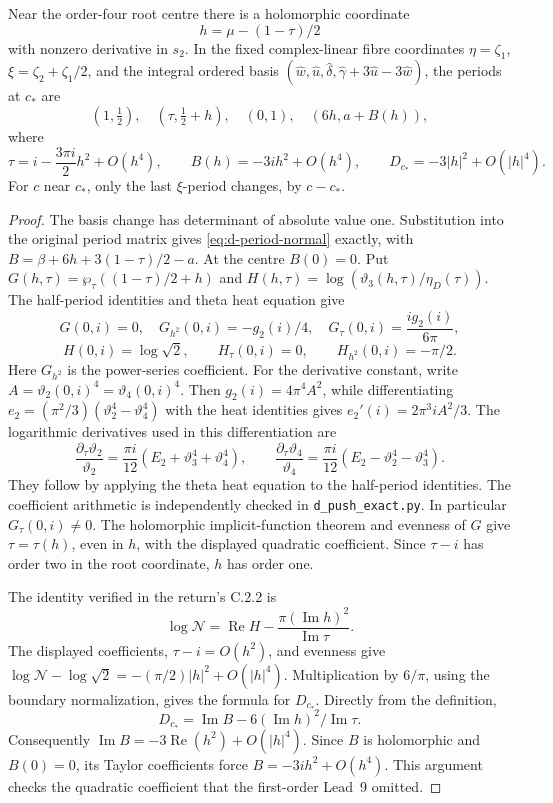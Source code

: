 \begin{lemma}[D.2.1; Proved]
Near the order-four root centre there is a holomorphic coordinate
\[
 h=\mu-(1-\tau)/2
\]
with nonzero derivative in \(s_2\). In the fixed complex-linear fibre
coordinates \(\eta=\zeta_1\), \(\xi=\zeta_2+\zeta_1/2\), and the
integral ordered basis
\((\widehat w,\widehat u,\widehat\delta,
\widehat\gamma+3\widehat u-3\widehat w)\), the periods at \(c_*\) are
\begin{equation}\label{eq:d-period-normal}
 (1,\tfrac12),\quad(\tau,\tfrac12+h),\quad(0,1),\quad(6h,a+B(h)),
\end{equation}
where
\[
 \tau=i-\frac{3\pi i}{2}h^2+O(h^4),\qquad
 B(h)=-3ih^2+O(h^4),\qquad
 D_{c_*}=-3|h|^2+O(|h|^4).
\]
For \(c\) near \(c_*\), only the last \(\xi\)-period changes, by
\(c-c_*\).
\end{lemma}
\begin{proof}
The basis change has determinant of absolute value one. Substitution
into the original period matrix gives \eqref{eq:d-period-normal}
exactly, with
\(B=\beta+6h+3(1-\tau)/2-a\).
At the centre \(B(0)=0\). Put
\(G(h,\tau)=\wp_\tau((1-\tau)/2+h)\) and
\(H(h,\tau)=\log(\vartheta_3(h,\tau)/\eta_D(\tau))\).
The half-period identities and theta heat equation give
\[
 G(0,i)=0,\quad G_{h^2}(0,i)=-g_2(i)/4,\quad
 G_\tau(0,i)=\frac{i g_2(i)}{6\pi},
\]
\[
 H(0,i)=\log\sqrt2,\qquad H_\tau(0,i)=0,\qquad
 H_{h^2}(0,i)=-\pi/2.
\]
Here \(G_{h^2}\) is the power-series coefficient. For the derivative
constant, write \(A=\vartheta_2(0,i)^4=\vartheta_4(0,i)^4\).
Then \(g_2(i)=4\pi^4A^2\), while differentiating
\(e_2=(\pi^2/3)(\vartheta_2^4-\vartheta_4^4)\) with the heat
identities gives \(e_2'(i)=2\pi^3iA^2/3\).
The logarithmic derivatives used in this differentiation are
\[
 \frac{\partial_\tau\vartheta_2}{\vartheta_2}
  =\frac{\pi i}{12}(E_2+\vartheta_3^4+\vartheta_4^4),\qquad
 \frac{\partial_\tau\vartheta_4}{\vartheta_4}
  =\frac{\pi i}{12}(E_2-\vartheta_2^4-\vartheta_3^4).
\]
They follow by applying the theta heat equation to the half-period
identities. The coefficient arithmetic is independently checked in
\texttt{d\_push\_exact.py}. In particular \(G_\tau(0,i)\ne0\).
The holomorphic implicit-function theorem and evenness of \(G\) give
\(\tau=\tau(h)\), even in \(h\), with the displayed quadratic
coefficient. Since \(\tau-i\) has order two in the root coordinate,
\(h\) has order one.

The identity verified in the return's C.2.2 is
\[
 \log\mathcal N=\operatorname{Re}H-
       \frac{\pi(\operatorname{Im}h)^2}{\operatorname{Im}\tau}.
\]
The displayed coefficients, \(\tau-i=O(h^2)\), and evenness give
\(\log\mathcal N-\log\sqrt2=-(\pi/2)|h|^2+O(|h|^4)\).
Multiplication by \(6/\pi\), using the boundary normalization, gives
the formula for \(D_{c_*}\). Directly from the definition,
\[
 D_{c_*}=\operatorname{Im}B-
             6(\operatorname{Im}h)^2/\operatorname{Im}\tau.
\]
Consequently \(\operatorname{Im}B=-3\operatorname{Re}(h^2)
+O(|h|^4)\). Since \(B\) is holomorphic and \(B(0)=0\), its Taylor
coefficients force \(B=-3ih^2+O(h^4)\). This argument checks the
quadratic coefficient that the first-order Lead~9 omitted.
\end{proof}

